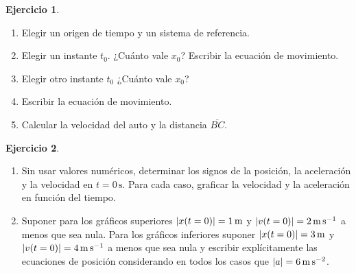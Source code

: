 \documentclass[a4paper,12pt,twoside]{book}
\newtheorem{ejercicio}{{Ejercicio}}[chapter]
\begin{document}
\begin{mdframed}[style=ejercicio-intermedio]
    \begin{ejercicio}
    \end{ejercicio}
    \begin{enumerate}
        \item Elegir un origen de tiempo y un sistema de referencia.
        \item Elegir un instante $t_0$. ¿Cuánto vale $x_0$? Escribir la ecuación de movimiento.
        \item Elegir otro instante $t_0$ ¿Cuánto vale $x_0$?
        \item Escribir la ecuación de movimiento.
        \item Calcular la velocidad del auto y la distancia $\overline{BC}$.
    \end{enumerate}
\end{mdframed}

\begin{mdframed}[style=ejercicio-intermedio]
    \begin{ejercicio}
    \end{ejercicio}
    \begin{center}
        \def\svgwidth{0.8\linewidth}
        
    \end{center}
    \begin{enumerate}
        \item
        Sin usar valores numéricos, determinar los signos de la posición, la aceleración y la velocidad en $t=0\,\si{\second}$. Para cada caso, graficar la velocidad y la aceleración en función del tiempo.
        \item
        Suponer para los gráficos superiores ${\left| {x(t=0)} \right|}=1\,\si{\metre}$ y ${\left| {v(t=0)} \right|}=2\,\si{\metre\per\second}$ a menos que sea nula. Para los gráficos inferiores suponer ${\left| {x(t=0)} \right|}=3\,\si{\metre}$ y ${\left| {v(t=0)} \right|}=4\,\si{\metre\per\second}$ a menos que sea nula y escribir explícitamente las ecuaciones de posición considerando en todos los casos que ${\left| {a} \right|}=6\,\si{\metre\per\second\squared}$.
    \end{enumerate}
\end{mdframed}
\end{document}
